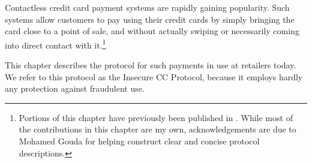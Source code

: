 Contactless credit card payment systems are rapidly gaining popularity.
Such systems allow customers to pay using their credit cards by simply bringing the card close to a point of sale,
    and without actually swiping or necessarily coming into direct contact with it.\footnote{
        Portions of this chapter have previously been published in \cite{jensen1}.
        While most of the contributions in this chapter are my own,
        acknowledgements are due to Mohamed Gouda for helping construct clear and concise protocol descriptions.
}

This chapter describes the protocol for such payments in use at retailers today.
We refer to this protocol as the Insecure CC Protocol, because it employs hardly any protection against fraudulent use.
